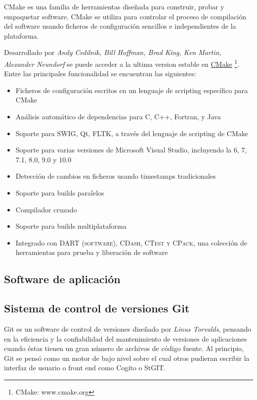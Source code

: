 \documentclass[12pt]{book} %
\begin{document}
		CMake es una familia de herramientas diseñada para construir, probar y empaquetar software. CMake se utiliza para controlar el
		proceso de compilación del software usando ficheros de configuración sencillos e independientes de la plataforma. 
		
		Desarrollado por \textit{Andy Cedilnik, Bill Hoffman, Brad King, Ken Martin, Alexander Neundorf} se puede acceder a la ultima 
		version estable en \href{www.cmake.org}{CMake} \footnote{\scriptsize CMake: www.cmake.org}.\\
		
		Entre las principales funcionalidad se encuentran las siguientes:
		\begin{multicols}{2}
			\begin{itemize}
				\item Ficheros de configuración escritos en un lenguaje de scripting específico para CMake
				\item Análisis automático de dependencias para C, C++, Fortran, y Java
				\item Soporte para SWIG, Qt, FLTK, a través del lenguaje de scripting de CMake
				\item Soporte para varias versiones de Microsoft Visual Studio, incluyendo la 6, 7, 7.1, 8.0, 9.0 y 10.0
				\item Detección de cambios en ficheros usando timestamps tradicionales
				\item Soporte para builds paralelos
				\item Compilador cruzado
				\item Soporte para builds multiplataforma
				\item Integrado con \textsc{DART (software), CDash, CTest y CPack}, una colección de herramientas para prueba y liberación
				 de software
			\end{itemize}
		\end{multicols}
		
	\subsection*{Software de aplicación}
	
	\subsection{Sistema de control de versiones Git \label{git}}
		Git es un software de control de versiones diseñado por \textit{Linus Torvalds}, pensando en la eficiencia y la confiabilidad del
		mantenimiento de versiones de aplicaciones cuando éstas tienen un gran número de archivos de código fuente. Al principio, Git se
		pensó como un motor de bajo nivel sobre el cual otros pudieran escribir la interfaz de usuario o front end como Cogito o StGIT. 
		
\end{document}
